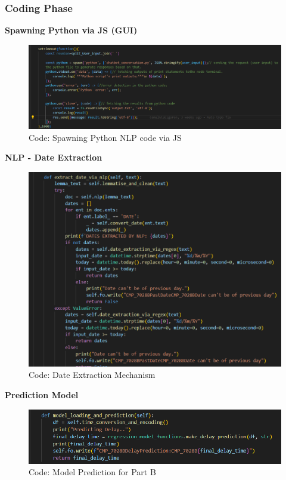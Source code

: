 \subsubsection{Coding Phase}
\textbf{Spawning Python via JS (GUI)}
\begin{figure} [!htbp]
    \centering
    \includegraphics[width=1\linewidth]{Diagrams/Group_work/spawn.png}
    \caption{Code: Spawning Python NLP code via JS}
    \label{fig:python_spawn}
\end{figure}

\textbf{NLP - Date Extraction}
\begin{figure} [!htbp]
    \centering
    \includegraphics[width=1\linewidth]{Diagrams/Group_work/date_extraction_nlp.png}
    \caption{Code: Date Extraction Mechanism}
    \label{fig:date_extraction_nlp}
\end{figure}

\textbf{Prediction Model}
\begin{figure} [!htbp]
    \centering
    \includegraphics[width=1\linewidth]{Diagrams/Group_work/model_loading_code.png}
    \caption{Code: Model Prediction for Part B}
    \label{fig:model_prediction}
\end{figure}

